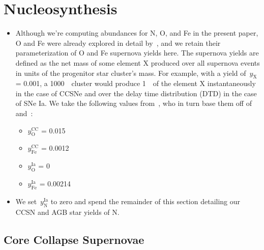 \documentclass[ms.tex]{subfiles}
\begin{document}
 

\section{Nucleosynthesis} 
\label{sec:yields} 

\begin{itemize} 
	\item Although we're computing abundances for N, O, and Fe in the present 
	paper, O and Fe were already explored in detail by~\citet{Johnson2021}, and 
	we retain their parameterization of O and Fe supernova yields here. 
	The supernova yields are defined as the net mass of some element X produced 
	over all supernova events in units of the progenitor star cluster's mass. 
	For example, with a yield of~$y_\text{X}$ = 0.001, a 1000~\msun~cluster 
	would produce 1~\msun~of the element X instantaneously in the case of 
	CCSNe and over the delay time distribution (DTD) in the case of SNe Ia. 
	We take the following values from~\citet{Johnson2021}, who in turn base 
	them off of~\citet{Weinberg2017} and~\citet{Johnson2020}: 
	\begin{itemize} 
		\item $y_\text{O}^\text{CC}$ = 0.015 

		\item $y_\text{Fe}^\text{CC}$ = 0.0012 

		\item $y_\text{O}^\text{Ia}$ = 0 

		\item $y_\text{Fe}^\text{Ia}$ = 0.00214 
	\end{itemize} 

	\item We set~$y_\text{N}^\text{Ia}$ to zero and spend the remainder of this 
	section detailing our CCSN and AGB star yields of N. 
\end{itemize} 

\subsection{Core Collapse Supernovae} 
\label{sec:methods:ccsn} 
\end{document}
